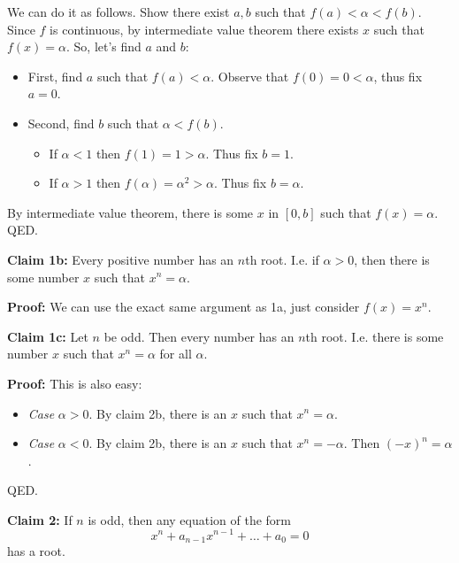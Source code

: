 We can do it as follows. Show there exist $a,b$ such that
$f(a)<\alpha<f(b)$. Since $f$ is continuous, by intermediate value theorem
there exists $x$ such that $f(x)=\alpha$. So, let's find $a$ and $b$:
\begin{itemize}
\item First, find $a$ such that $f(a)<\alpha$. Observe that
  $f(0)=0<\alpha$, thus fix $a=0$.
\item Second, find $b$ such that $\alpha<f(b)$.
  \begin{itemize}
  \item If $\alpha<1$ then $f(1)=1>\alpha$. Thus fix $b=1$.
  \item If $\alpha>1$ then $f(\alpha)=\alpha^{2}>\alpha$. Thus fix $b=\alpha$.
  \end{itemize}
\end{itemize}

By intermediate value theorem, there is some $x$ in $[0,b]$ such that
$f(x)=\alpha$. QED.

\vs

\textbf{Claim 1b:} Every positive number has an $n$th root. I.e. if
$\alpha>0$, then there is some number $x$ such that $x^{n}=\alpha$.

\vs

\textbf{Proof:} We can use the exact same argument as 1a, just
consider $f(x)=x^{n}$.

\vs

\textbf{Claim 1c:} Let $n$ be odd. Then every number has an $n$th
root. I.e. there is some number $x$ such that $x^{n}=\alpha$ for all $\alpha$.

\vs

\textbf{Proof:} This is also easy:
\begin{itemize}
\item \textit{Case} $\alpha>0$. By claim 2b, there is an $x$ such that $x^{n}=\alpha$.
\item \textit{Case} $\alpha<0$. By claim 2b, there is an $x$ such that
  $x^{n}=-\alpha$. Then $(-x)^{n}=\alpha$.
\end{itemize}

QED.

\vs

\textbf{Claim 2:} If $n$ is odd, then any equation of the form
\[x^{n}+a_{n-1}x^{n-1}+\ldots+a_{0}=0\]
has a root.

\vs

